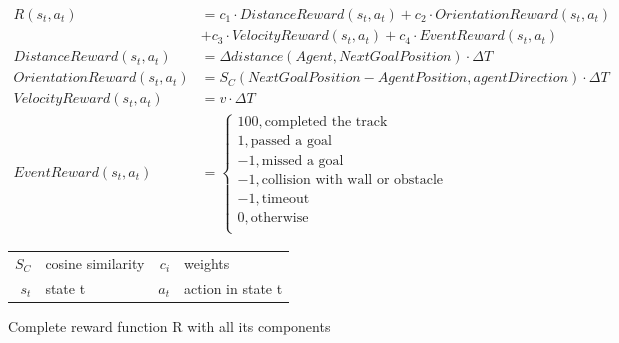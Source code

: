\begin{figure}
    \centering
    \begin{align}
        R(s_t,a_t)                 & = c_1 \cdot DistanceReward(s_t,a_t) + c_2 \cdot OrientationReward(s_t,a_t) \nonumber \\
                                   & + c_3 \cdot VelocityReward(s_t, a_t) + c_4 \cdot EventReward(s_t, a_t) \nonumber     \\
        DistanceReward(s_t,a_t)    & = \Delta distance(Agent, NextGoalPosition) \cdot \Delta T \nonumber                  \\
        OrientationReward(s_t,a_t) & = S_C(NextGoalPosition - AgentPosition, agentDirection) \cdot \Delta T \nonumber     \\
        VelocityReward(s_t, a_t)   & = v \cdot \Delta T \nonumber                                                         \\
        EventReward(s_t, a_t)      & = \begin{cases}
                                           100,           \text{completed the track}           \\
                                           1,             \text{passed a goal}                   \\
                                           -1,            \text{missed a goal}                   \\
                                           -1,            \text{collision with wall or obstacle} \\
                                           -1,            \text{timeout}                         \\
                                           0,             \text{otherwise}                       \\
                                       \end{cases} \nonumber
    \end{align}
    \caption{Complete reward function R with all its components}
    \begin{tabular}{r@{: }l r@{: }l}
        $S_C$ & cosine similarity & $c_i$ & weights           \\
        $s_t$ & state t           & $a_t$ & action in state t
    \end{tabular}
    \label{fig:reward_functions}
\end{figure}



